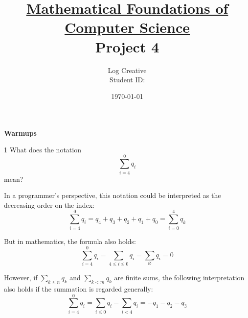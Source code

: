 \documentclass[a4paper,12pt]{article}
\title{\small \underline{Mathematical Foundations of Computer Science}\\\Large Project 4}
\author{Log Creative\\\small Student ID: }
\date{\today}
\makeatletter
\newtheorem*{solution}{Solution}
\theoremstyle{definition}
\renewenvironment{solution}[1][Solution] {\par\pushQED{\qed}\normalfont\topsep6\p@\@plus6\p@\relax\trivlist\item[\hskip\labelsep\bfseries#1\@addpunct{.}]\ignorespaces}{\popQED\endtrivlist\@endpefalse} \makeatother
\newenvironment{problems}{\begin{list}{}{\renewcommand{\makelabel}[1]{\textbf{##1}\hfil}}}{\end{list}}
\makeatother
\begin{document}
\maketitle

\noindent\textbf{Warmups}

\begin{problems}
    \item[1] What does the notation
    \begin{equation*}
        \sum_{i=4}^0 q_i
    \end{equation*} 
    mean?
    \begin{solution}
        In a programmer's perspective, this notation could be interpreted as the decreasing order on the index:
        \begin{equation*}
            \sum_{i=4}^0 q_i = q_4 + q_3 + q_2 + q_1 + q_0 = \sum_{i=0}^4 q_k
        \end{equation*}
        
        But in mathematics, the formula also holds:
        \begin{equation*}
            \sum_{i=4}^0 q_i = \sum_{4\leq i \leq 0} q_i = \sum_{\varnothing} q_i = 0
        \end{equation*}

        However, if $\sum_{k\leq n}q_k$ and $\sum_{k<m} q_k$ are finite sums, the following interpretation also holds if the summation is regarded generally:
        \begin{equation*}
            \sum_{i=4}^0 q_i = \sum_{i\leq 0} q_i - \sum_{i<4} q_i = -q_1-q_2-q_3
        \end{equation*}


\end{solution}
\end{problems}
\end{document}
